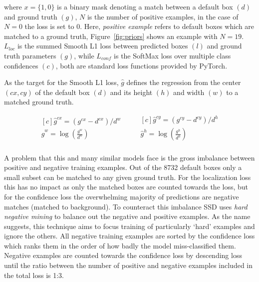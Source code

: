 where \( x=\{1,0\} \) is a binary mask denoting a match between a default box \((d)\) and ground truth \((g)\), \( N \) is the number of positive examples, in the case of \(N=0\) the loss is set to 0.
Here, \textit{positive example} refers to default boxes which are matched to a ground truth, Figure~\ref{fig:priors} shows an example with \(N=19\).
\( L_{loc} \) is the summed Smooth L1 loss between predicted boxes \((l)\) and ground truth parameters \((g)\), while \( L_{conf} \) is the SoftMax loss over multiple class confidences \((c)\), both are standard loss functions provided by PyTorch.

As the target for the Smooth L1 loss, \(\hat{g}\) defines the regression from the center \((cx,cy)\) of the default box \((d)\) and its height \((h)\) and width \((w)\) to a matched ground truth.

\begin{equation*}
  \begin{aligned}[c]
\hat{g}^{cx}=(g^{cx}-d^{cx})/d^{w}\\
\hat{g}^{w}=\log\left(\frac{g^{w}}{d^{w}}\right)\\
  \end{aligned}
  \qquad
  \begin{aligned}[c]
    \hat{g}^{cy}=(g^{cy}-d^{cy})/d^{h}\\
    \hat{g}^{h}=\log\left(\frac{g^{h}}{d^{h}}\right)\\
  \end{aligned}
  \end{equation*}

A problem that this and many similar models face is the gross imbalance between positive and negative training examples.
Out of the 8732 default boxes only a small subset can be matched to any given ground truth.
For the localization loss this has no impact as only the matched boxes are counted towards the loss, but for the confidence loss the overwhelming majority of predictions are negative matches (matched to background).
To counteract this imbalance SSD uses \textit{hard negative mining} to balance out the negative and positive examples.
As the name suggests, this technique aims to focus training of particularly `hard' examples and ignore the others.
All negative training examples are sorted by the confidence loss which ranks them in the order of how badly the model miss-classified them.
Negative examples are counted towards the confidence loss by descending loss until the ratio between the number of positive and negative examples included in the total loss is 1:3.

